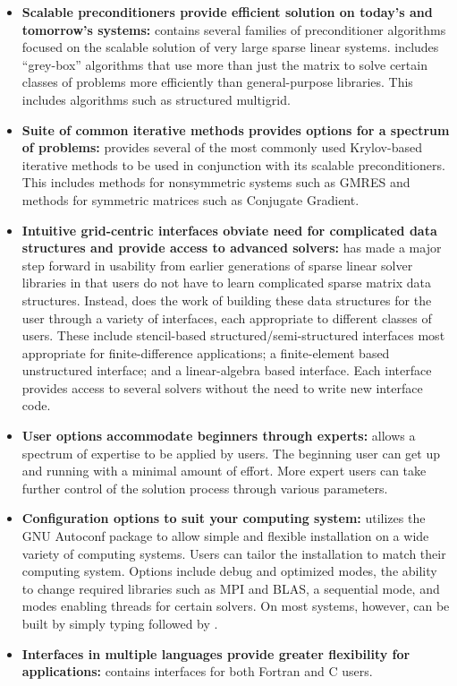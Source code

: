 \begin{itemize}

\item
{\bf Scalable preconditioners provide efficient solution on today's
and tomorrow's systems:} \hypre{} contains several families of
preconditioner algorithms focused on the scalable solution of very
large sparse linear systems. \hypre{} includes ``grey-box'' algorithms
that use more than just the matrix to solve certain classes of
problems more efficiently than general-purpose libraries. This
includes algorithms such as structured multigrid.

\item
{\bf Suite of common iterative methods provides options for a spectrum
of problems:} \hypre{} provides several of the most commonly used
Krylov-based iterative methods to be used in conjunction with its
scalable preconditioners. This includes methods for nonsymmetric
systems such as GMRES and methods for symmetric matrices such as
Conjugate Gradient.

\item
{\bf Intuitive grid-centric interfaces obviate need for complicated
data structures and provide access to advanced solvers:} \hypre{} has
made a major step forward in usability from earlier generations of
sparse linear solver libraries in that users do not have to learn
complicated sparse matrix data structures.  Instead, \hypre{} does the
work of building these data structures for the user through a variety
of interfaces, each appropriate to different classes of users.  These
include stencil-based structured/semi-structured interfaces most
appropriate for finite-difference applications; a finite-element based
unstructured interface; and a linear-algebra based interface.  Each
interface provides access to several solvers without the need to write
new interface code.

\item
{\bf User options accommodate beginners through experts:} \hypre{}
allows a spectrum of expertise to be applied by users. The beginning
user can get up and running with a minimal amount of effort. More
expert users can take further control of the solution process through
various parameters.

\item
{\bf Configuration options to suit your computing system:} \hypre{}
utilizes the GNU Autoconf package to allow simple and flexible
installation on a wide variety of computing systems.  Users can tailor
the installation to match their computing system. Options include
debug and optimized modes, the ability to change required libraries
such as MPI and BLAS, a sequential mode, and modes enabling threads
for certain solvers.  On most systems, however, \hypre{} can be built
by simply typing  followed by .

\item
{\bf Interfaces in multiple languages provide greater flexibility for
applications:} \hypre{} contains interfaces for both Fortran and C
users.

\end{itemize}

